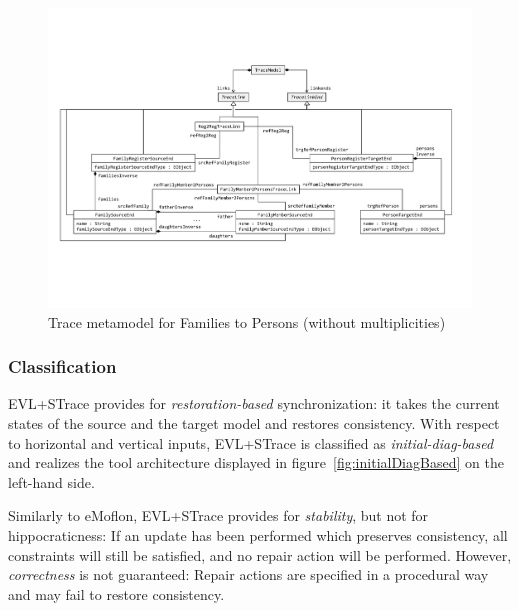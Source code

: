 \begin{figure}[tb!]
	\centering
	\includegraphics[width=\textwidth]{diagrams/solutions/EVLPlusSTraceMetamodel}
	\caption{Trace metamodel for Families to Persons (without multiplicities)}
	\label{fig:evltracemetamodel}
\end{figure}

\subsubsection{Classification}
\label{sec:ClassificationEVL}

EVL+STrace provides for \emph{restoration-based} synchronization: it takes the current states of the source and the target model and restores consistency. With respect to horizontal and vertical inputs, EVL+STrace is classified as \emph{initial-diag-based} and realizes the tool architecture displayed in figure~\ref{fig:initialDiagBased} on the left-hand side. 

Similarly to eMoflon, EVL+STrace provides for \emph{stability}, but not for hippocraticness: If an update has been performed which preserves consistency, all constraints will still be satisfied, and no repair action will be performed. However, \emph{correctness} is not guaranteed: Repair actions are specified in a procedural way and may fail to restore consistency.   


